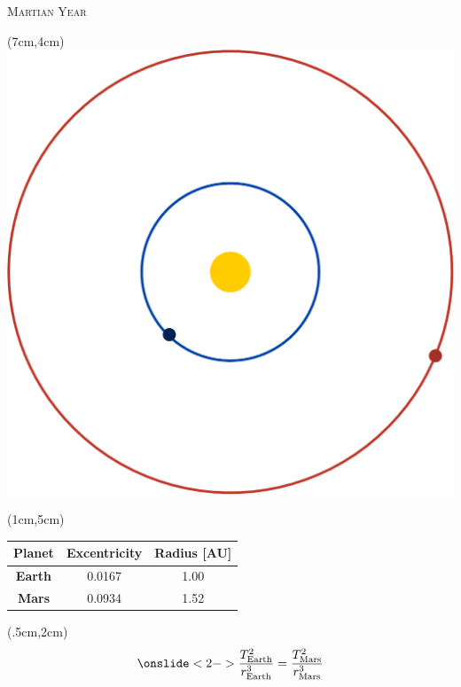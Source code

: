 \documentclass[9pt]{beamer}
\begin{document}
    \begin{frame}{\textsc{Martian Year}}
        \begin{textblock*}{5cm}(7cm,4cm)
            \centering
            \includegraphics[scale=0.25]{assets/eccentricity.pdf}
        \end{textblock*}
        
        \begin{textblock*}{5cm}(1cm,5cm)
            \centering
            \begin{tabular}{ccc}
                \hline
                \textbf{Planet} &{\textbf{Excentricity}} & {\textbf{Radius [AU]}}\\
                \hline
                \textbf{Earth}   &  0.0167 & {1.00} \\
                \textbf{Mars}    &  0.0934 & {1.52} \\ \hline
            \end{tabular}
        \end{textblock*}
        
        \begin{textblock*}{12cm}(.5cm,2cm)
        \begin{equation*}
            \onslide<2->{\frac{T_{\text{Earth}}^2}{r_{\text{Earth}}^3} = \frac{T_{\text{Mars}}^2}{r_{\text{Mars}}^3}}
        \end{equation*}
        \end{textblock*}
    \end{frame}
\end{document}
